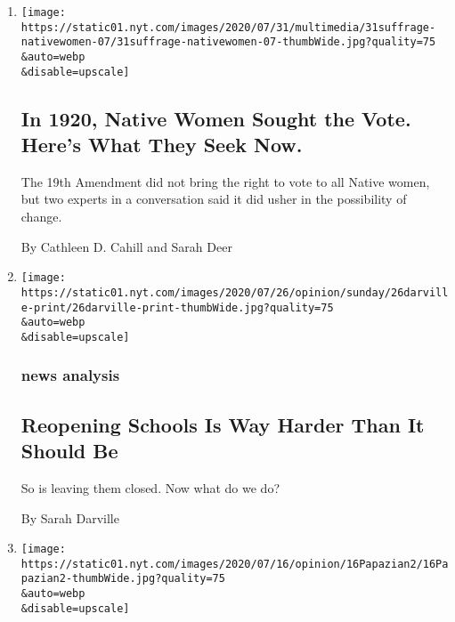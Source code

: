 \begin{enumerate}
\def\labelenumi{\arabic{enumi}.}
\item
  \href{/2020/07/31/style/19th-amendment-native-womens-suffrage.html}{}

  \texttt{[image: https://static01.nyt.com/images/2020/07/31/multimedia/31suffrage-nativewomen-07/31suffrage-nativewomen-07-thumbWide.jpg?quality=75\\\&auto=webp\\\&disable=upscale]}

  \hypertarget{in-1920-native-women-sought-the-vote-heres-what-they-seek-now}{%
  \subsection{In 1920, Native Women Sought the Vote. Here's What They
  Seek
  Now.}\label{in-1920-native-women-sought-the-vote-heres-what-they-seek-now}}

  The 19th Amendment did not bring the right to vote to all Native
  women, but two experts in a conversation said it did usher in the
  possibility of change.

  By Cathleen D. Cahill and Sarah Deer
\item
  \href{/2020/07/23/sunday-review/reopening-schools-coronavirus.html}{}

  \texttt{[image: https://static01.nyt.com/images/2020/07/26/opinion/sunday/26darville-print/26darville-print-thumbWide.jpg?quality=75\\\&auto=webp\\\&disable=upscale]}

  \hypertarget{news-analysis}{%
  \subsubsection{news analysis}\label{news-analysis}}

  \hypertarget{reopening-schools-is-way-harder-than-it-should-be}{%
  \subsection{Reopening Schools Is Way Harder Than It Should
  Be}\label{reopening-schools-is-way-harder-than-it-should-be}}

  So is leaving them closed. Now what do we do?

  By Sarah Darville
\item
  \href{/2020/07/16/opinion/culture/mashrou-leila-fan-suicide.html}{}

  \texttt{[image: https://static01.nyt.com/images/2020/07/16/opinion/16Papazian2/16Papazian2-thumbWide.jpg?quality=75\\\&auto=webp\\\&disable=upscale]}


\end{enumerate}
